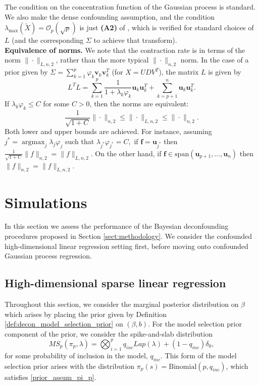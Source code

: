 \documentclass[11pt]{article}
\newcommand{\subparspace}{\vspace{3mm} \\}
\newcommand{\cO}{\mathcal{O}}
\newcommand{\LX}{\tilde{X}}
\begin{document}
 The condition on the concentration function of the Gaussian process is standard. We also make the dense confounding assumption, and the condition  $\lambda_{\max}(\LX) = \cO_p(\sqrt{p})$ is just {\bf (A2)} of \cite{CBM2020}, which is verified for standard choices of $L$ (and the corresponding $\Sigma$ to achieve that transform).
\subparspace
{\bf Equivalence of norms.} We note that the contraction rate is in terms of the norm $\|\cdot\|_{L, n, 2}$, rather than the more typical $\|\cdot\|_{n, 2}$ norm. In the case of a prior given by $\Sigma = \sum_{k = 1}^p \varphi_k \mathbf{v}_k \mathbf{v}_k^T$ (for $X = UDV^T$), the matrix $L$ is given by 
$$
L^TL = \sum_{k=1}^p\frac{1}{1+\lambda_k \varphi_k}\mathbf{u}_k \mathbf{u}_k^T + \sum_{k = p+1}^n \mathbf{u}_k \mathbf{u}_k^T.$$ If $\lambda_k \varphi_k \leq C$
for some $C > 0$, then the norms are equivalent:
$$
\frac{1}{\sqrt{1+C}} \|\cdot\|_{n ,2} \leq  \|\cdot\|_{L, n ,2} \leq \|\cdot\|_{n , 2}.
$$ 
Both lower and upper bounds are achieved. For instance, assuming $j^* = \operatorname{argmax}_j \lambda_j \varphi_j$ such that $\lambda_{j^*}\varphi_{j^*} = C,$ if $\mathbf{f} = \mathbf{u}_{j^*}$ then $\frac{1}{\sqrt{1+C}}\|f\|_{n, 2} = \|f\|_{L, n, 2}$. On the other hand, if $\mathbf{f} \in \textrm{span}(\mathbf{u}_{p+1}, \dots, \mathbf{u}_{n})$ then $\|f\|_{n, 2} = \|f\|_{L, n, 2}$.

\section{Simulations}\label{sect:simulations}
In this section we assess the performance of the Bayesian deconfounding procedures proposed in Section \ref{sect:methodology}. We consider the confounded high-dimensional linear regression setting first, before moving onto confounded Gaussian process regression. 
\subsection{High-dimensional sparse linear regression}
Throughout this section, we consider the marginal posterior distribution on $\beta$ which arises by placing the prior given by Definition \ref{def:decon_model_selection_prior} on $(\beta, b)$. For the model selection prior component of the prior, we consider the spike-and-slab distribution
$$
MS_p(\pi_p, \lambda) = \bigotimes_{i = 1}^p q_{inc} Lap(\lambda) + (1-q_{inc})\delta_0,
$$
for some probability of inclusion in the model, $q_{inc}$. This form of the model selection prior arises with the distribution $\pi_p(s) = \textrm{Binomial}(p, q_{inc})$, which satisfies \eqref{prior_assum_pi_p}.
\end{document}
